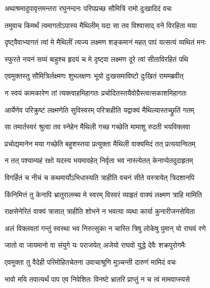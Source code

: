 
\twolineshloka
{अथाश्रमादुपावृत्तमन्तरा रघुनन्दनः}
{परिपप्रच्छ सौमित्रिं रामो दुःखादिदं वचः} %

\twolineshloka
{तमुवाच किमर्थं त्वमागतोऽपास्य मैथिलीम्}
{यदा सा तव विश्वासाद् वने विरहिता मया} %

\twolineshloka
{दृष्ट्वैवाभ्यागतं त्वां मे मैथिलीं त्यज्य लक्ष्मण}
{शङ्कमानं महत् पापं यत्सत्यं व्यथितं मनः} %

\twolineshloka
{स्फुरते नयनं सव्यं बाहुश्च हृदयं च मे}
{दृष्ट्वा लक्ष्मण दूरे त्वां सीताविरहितं पथि} %

\twolineshloka
{एवमुक्तस्तु सौमित्रिर्लक्ष्मणः शुभलक्षणः}
{भूयो दुःखसमाविष्टो दुःखितं राममब्रवीत्} %

\twolineshloka
{न स्वयं कामकारेण तां त्यक्त्वाहमिहागतः}
{प्रचोदितस्तयैवोग्रैस्त्वत्सकाशमिहागतः} %

\twolineshloka
{आर्येणेव परिक्रुष्टं लक्ष्मणेति सुविस्वरम्}
{परित्राहीति यद्वाक्यं मैथिल्यास्तच्छ्रुतिं गतम्} %

\twolineshloka
{सा तमार्तस्वरं श्रुत्वा तव स्नेहेन मैथिली}
{गच्छ गच्छेति मामाशु रुदती भयविक्लवा} %

\twolineshloka
{प्रचोद्यमानेन मया गच्छेति बहुशस्तया}
{प्रत्युक्ता मैथिली वाक्यमिदं तत् प्रत्ययान्वितम्} %

\twolineshloka
{न तत् पश्याम्यहं रक्षो यदस्य भयमावहेत्}
{निर्वृता भव नास्त्येतत् केनाप्येतदुदाहृतम्} %

\twolineshloka
{विगर्हितं च नीचं च कथमार्योऽभिधास्यति}
{त्राहीति वचनं सीते यस्त्रायेत् त्रिदशानपि} %

\twolineshloka
{किंनिमित्तं तु केनापि भ्रातुरालम्ब्य मे स्वरम्}
{विस्वरं व्याहृतं वाक्यं लक्ष्मण त्राहि मामिति} %

\twolineshloka
{राक्षसेनेरितं वाक्यं त्रासात् त्राहीति शोभने}
{न भवत्या व्यथा कार्या कुनारीजनसेविता} %

\twolineshloka
{अलं विक्लवतां गन्तुं स्वस्था भव निरुत्सुका}
{न चास्ति त्रिषु लोकेषु पुमान् यो राघवं रणे} %

\twolineshloka
{जातो वा जायमानो वा संयुगे यः पराजयेत्}
{अजेयो राघवो युद्धे देवैः शक्रपुरोगमैः} %

\twolineshloka
{एवमुक्ता तु वैदेही परिमोहितचेतना}
{उवाचाश्रूणि मुञ्चन्ती दारुणं मामिदं वचः} %

\twolineshloka
{भावो मयि तवात्यर्थं पाप एव निवेशितः}
{विनष्टे भ्रातरि प्राप्तुं न च त्वं मामवाप्स्यसे} %

